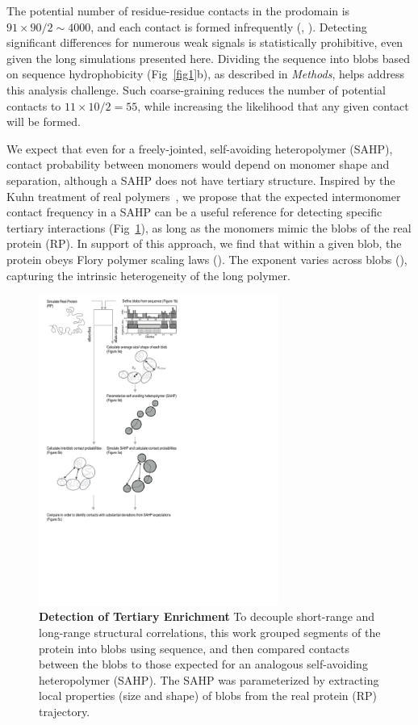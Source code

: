 \documentclass[10pt,letterpaper]{article}
\begin{document}
The potential number of residue-residue contacts in the prodomain is $91\times90/2\sim4000$, and each contact is formed infrequently (, ). Detecting significant differences for numerous weak signals is statistically prohibitive, even given the long simulations presented here. Dividing the sequence into blobs based on sequence hydrophobicity (Fig~\ref{fig1}b), as described in {\it Methods}, helps address this analysis challenge. Such coarse-graining reduces the number of potential contacts to $11\times10/2=55$, while increasing the likelihood that any given contact will be formed. 

We expect that even for a freely-jointed, self-avoiding heteropolymer (SAHP), contact probability between monomers would depend on monomer shape and separation, although a SAHP does not have tertiary structure. Inspired by the Kuhn treatment of real polymers~\cite{Rubinstein2003}, we propose that the expected intermonomer contact frequency in a SAHP can be a useful reference for detecting specific tertiary interactions (Fig~\ref{fig:schematic}), as long as the monomers mimic the blobs of the real protein (RP). In support of this approach, we find that within a given blob, the protein obeys Flory polymer scaling laws (). The exponent varies across blobs (), capturing the intrinsic heterogeneity of the long polymer.

\begin{figure}[!ht]
\includegraphics[width=0.7\textwidth,trim={0 0cm 0 0cm},clip]{./figures/fig4.pdf}
\caption{{\bf Detection of Tertiary Enrichment } To decouple short-range and long-range structural correlations, this work grouped segments of the protein into blobs using sequence, and then compared contacts between the blobs to those expected for an analogous self-avoiding heteropolymer (SAHP). The SAHP was parameterized by extracting local properties (size and shape) of blobs from the real protein (RP) trajectory.}
\label{fig:schematic}
\end{figure}
\end{document}
